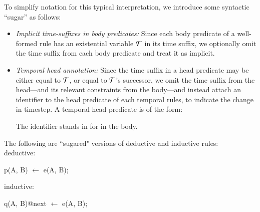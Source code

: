 To simplify \slang notation for this typical interpretation, we
introduce some syntactic ``sugar'' as follows:

\begin{itemize}
%
%
\item {\em Implicit time-suffixes in body predicates:} Since each body
predicate of a well-formed rule has an existential variable $\mathcal{T}$ in its
time suffix, we optionally omit the time suffix from each body predicate and treat
it as implicit.
%
\item {\em Temporal head annotation:} Since the time suffix in a head predicate
may be either equal to $\mathcal{T}$, or equal to $\mathcal{T}$'s successor, we omit the time
suffix from the head---and its relevant constraints from the body---and
instead attach an identifier to the head predicate of each temporal rules, to indicate the change in
timestep.  A temporal head predicate is of the form:


The identifier  stands in for  in
the body.

%
%
%
%
%
\end{itemize}


\begin{example}
The following are ``sugared" versions of deductive and inductive rules:
\\
deductive:
\begin{Dedalus}
p(A, B) \(\leftarrow\) e(A, B);
\end{Dedalus}
inductive:
\begin{Dedalus}
q(A, B)@next \(\leftarrow\) e(A, B);
\end{Dedalus}
\end{example}


